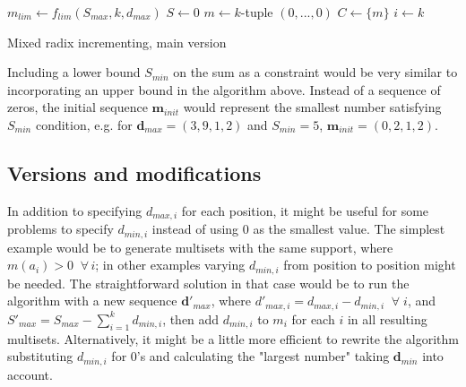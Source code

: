 \documentclass[12pt]{article}
\begin{document}
\begin{algorithm}[H]

  \BlankLine
  $m_{lim} \gets f_{lim}(S_{max}, k, d_{max})$\;
  $S \gets 0$\;
  $m \gets k$-tuple $(0, ..., 0)$\;
  $C \gets \{m\}$
  $i \gets k$\;
  \caption{Mixed radix incrementing, main version}
\end{algorithm}  

\vspace{5mm}
Including a lower bound $S_{min}$ on the sum as a constraint would be very similar to incorporating an upper bound in the algorithm above. Instead of a sequence of zeros, the initial sequence $\boldsymbol{m}_{init}$ would represent the smallest number satisfying $S_{min}$ condition, e.g. for $\boldsymbol{d}_{max} = (3, 9, 1, 2)$ and $S_{min} = 5$, $\boldsymbol{m}_{init} = (0, 2, 1, 2)$. 

\subsection{Versions and modifications} \label{sec:mod}

In addition to specifying $d_{max, i}$ for each position, it might be useful for some problems to specify $d_{min, i}$ instead of using $0$ as the smallest value. The simplest example would be to generate multisets with the same support, where $m(a_i) > 0 \;\; \forall \, i$; in other examples varying $d_{min, i}$ from position to position might be needed. The straightforward solution in that case would be to run the algorithm with a new sequence $\boldsymbol{d}'_{max}$, where $d'_{max, i} = d_{max, i} - d_{min, i} \;\; \forall \; i$, and $S'_{max} = S_{max} - \sum_{i = 1}^k d_{min, i}$, then add $d_{min, i}$ to $m_i$ for each $i$ in all resulting multisets. Alternatively, it might be a little more efficient to rewrite the algorithm substituting $d_{min, i}$ for $0$'s and calculating the "largest number" taking $\boldsymbol{d}_{min}$ into account. \\
\end{document}
